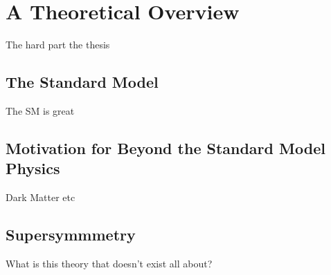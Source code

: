\chapter{A Theoretical Overview}
\label{chap:theorysection}

The hard part the thesis

\section{The Standard Model}

\label{sec:thesm}

The SM is great

\section{Motivation for Beyond the Standard Model Physics}

\label{sec:bsmmotivation}

Dark Matter etc

\section{Supersymmmetry}

\label{susytheory}

What is this theory that doesn't exist all about?
